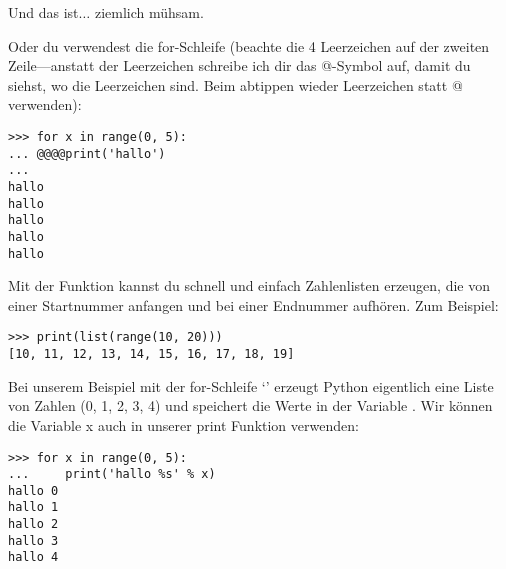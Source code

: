 Und das ist$\ldots$ ziemlich mühsam.

Oder du verwendest die for-Schleife (beachte die 4 Leerzeichen auf der zweiten Zeile---anstatt der Leerzeichen schreibe ich dir das @-Symbol auf, damit du siehst, wo die Leerzeichen sind. Beim abtippen wieder Leerzeichen statt @ verwenden):

\begin{Verbatim}[frame=single]
>>> for x in range(0, 5):
... @@@@print('hallo')
...
hallo
hallo
hallo
hallo
hallo
\end{Verbatim}

Mit der  Funktion kannst du schnell und einfach Zahlenlisten erzeugen, die von einer Startnummer anfangen und bei einer Endnummer aufhören. Zum Beispiel:

\begin{Verbatim}[frame=single]
>>> print(list(range(10, 20)))
[10, 11, 12, 13, 14, 15, 16, 17, 18, 19]
\end{Verbatim}

Bei unserem Beispiel mit der for-Schleife `' erzeugt Python eigentlich eine Liste von Zahlen (0, 1, 2, 3, 4) und speichert die Werte in der Variable . Wir können die Variable x auch in unserer print Funktion verwenden:

\begin{Verbatim}[frame=single]
>>> for x in range(0, 5):
...     print('hallo %s' % x)
hallo 0
hallo 1
hallo 2
hallo 3
hallo 4
\end{Verbatim}

